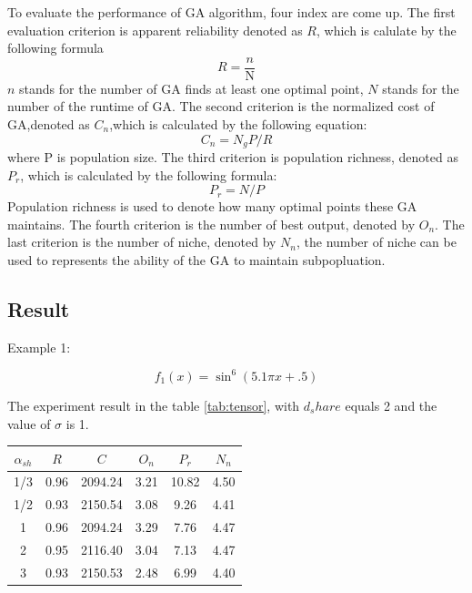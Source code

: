 \documentclass[smallextended]{svjour3}       %
\begin{document}
\begin{multicols}{2}
To evaluate the performance of GA algorithm, four index are come up. The first
evaluation criterion is apparent reliability denoted as $R$, which is calulate
by the following formula
\begin{equation}
R = \frac{n}{\text{N}}
\end{equation}
$n$ stands for the number of GA finds at least one optimal point, $N$ stands for
the number of the runtime of GA.
The second criterion is the normalized cost of GA,denoted as $C_n$,which is
calculated by the following equation:
\begin{equation}
C_{n} = N_{g}P/R
\end{equation}
where P is population size.  The third criterion is population richness, denoted
as $P_{r}$, which is calculated by the following formula:
$$
P_{r} = N/P
$$
Population richness is used to denote how many optimal points these GA
maintains.  The fourth criterion is the number of best output, denoted by
$O_{n}$.  The last criterion is the number of niche, denoted by $N_{n}$, the
number of niche can be used to represents the ability of the GA to maintain
subpopluation.


\subsection{Result}
Example 1:

\begin{equation}
f_{1}(x)=\sin^{6}(5.1 \pi x+.5)
\end{equation}

The experiment result in the table \ref{tab:tensor}, with $d_share$ equals 2 and the value of $\sigma$ 
is 1.

\begin{center}
\begin{tabular}{cccccc}
	\toprule
    $\alpha_{sh}$& $R$ & $C$ & $O_{n}$ & $P_{r}$ & $N_{n}$\\
	\midrule
    1/3  & 0.96  & 2094.24 & 3.21 & 10.82  & 4.50 \\
    1/2  & 0.93  & 2150.54 & 3.08 & 9.26  & 4.41 \\
    1    & 0.96  & 2094.24 & 3.29 & 7.76  & 4.47 \\
    2    & 0.95  & 2116.40 & 3.04 & 7.13 & 4.47 \\
    3    & 0.93  & 2150.53 & 2.48 & 6.99 & 4.40 \\
	\bottomrule
\end{tabular}
\label{tab:tensor}
\end{center}


\end{multicols}
\end{document}
